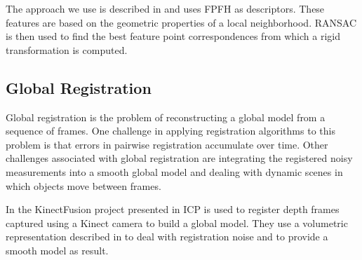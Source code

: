 \documentclass[a4paper]{article}
\begin{document}
The approach we use is described in \cite{rusu2009fast} and uses \ac{FPFH} as descriptors. These features are based on the geometric properties of a local neighborhood. \ac{RANSAC} is then used to find the best feature point correspondences from which a rigid transformation is computed.



\subsection{Global Registration}

Global registration is the problem of reconstructing a global model from a sequence of frames. %
One challenge in applying registration algorithms to this problem is that errors in pairwise registration accumulate over time. Other challenges associated with global registration are integrating the registered noisy measurements into a smooth global model and dealing with dynamic scenes in which objects move between frames.

In the KinectFusion project presented in \cite{izadi2011kinectfusion,newcombe2011kinectfusion} \ac{ICP} is used to register depth frames captured using a Kinect camera to build a global model. They use a volumetric representation described in \cite{curless1996volumetric} to deal with registration noise and to provide a smooth model as result.
\end{document}

